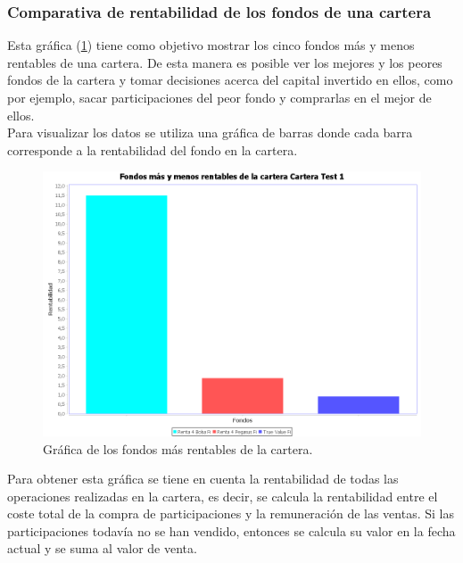 \documentclass[12pt, a4paper]{book}
\begin{document}
	\newpage

\subsubsection{Comparativa de rentabilidad de los fondos de una cartera}

Esta gráfica (\ref{fig:masrentables}) tiene como objetivo mostrar los cinco fondos más y menos rentables de una cartera. De esta manera es posible ver los mejores y los peores fondos de la cartera y tomar decisiones acerca del capital invertido en ellos, como por ejemplo, sacar participaciones del peor fondo y comprarlas en el mejor de ellos. \\

Para visualizar los datos se utiliza una gráfica de barras donde cada barra corresponde a la rentabilidad del fondo en la cartera.\\


	\begin{figure}[htbp]
	\centering
	\includegraphics[width=\textwidth]{figuras/masrentables.PNG}
	\caption{Gráfica de los fondos más rentables de la cartera.}
	\label{fig:masrentables}
	\end {figure}
	
Para obtener esta gráfica se tiene en cuenta la rentabilidad de todas las operaciones realizadas en la cartera, es decir, se calcula la rentabilidad entre el coste total de la compra de participaciones y la remuneración de las ventas. Si las participaciones todavía no se han vendido, entonces se calcula su valor en la fecha actual y se suma al valor de venta.\\
\end{document}

